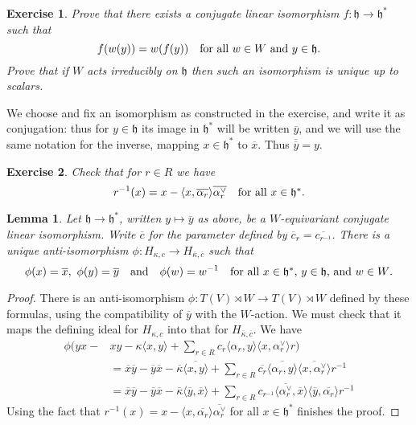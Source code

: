 \documentclass[12pt, reqno]{amsart}
\numberwithin{equation}{section}
\theoremstyle{definition}
\theoremstyle{plain}
\newtheorem{lemma}[theorem]{Lemma}
\newtheorem{exercise}{Exercise}
\newcommand{\hh}{\mathfrak{h}}
\newcommand{\la}{\langle}
\newcommand{\ra}{\rangle}
\begin{document}
\begin{exercise}
Prove that there exists a conjugate linear isomorphism $f:\hh \rightarrow \hh^*$ such that
$$f(w(y))=w(f(y)) \quad \hbox{for all $w \in W$ and $y \in \hh$.}$$ Prove that if $W$ acts irreducibly on $\hh$ then such an isomorphism is unique up to scalars.
\end{exercise}	

We choose and fix an isomorphism as constructed in the exercise, and write it as conjugation: thus for $y \in \hh$ its image in $\hh^*$ will be written $\overline{y}$, and we will use the same notation for the inverse, mapping $x \in \hh^*$ to $\overline{x}$. Thus $\overline{\overline{y}}=y$. 

\begin{exercise}
Check that for $r \in R$ we have
$$r^{-1}(x)=x-\la x, \overline{\alpha_r} \ra \overline{\alpha_r^\vee} \quad \hbox{for all $x \in \hh^*$.}$$	
\end{exercise}


\begin{lemma}
Let $\hh \rightarrow \hh^*$, written $y \mapsto \overline{y}$ as above, be a $W$-equivariant conjugate linear isomorphism. Write $\overline{c}$ for the parameter defined by $\overline{c}_r=\overline{c_{r^{-1}}}$. There is a unique anti-isomorphism $\phi:H_{\kappa,c} \rightarrow H_{\overline{\kappa}, \overline{c}}$ such that $$\phi(x)=\overline{x}, \ \phi(y)=\overline{y} \quad \text{and} \quad \phi(w)=w^{-1} \quad \hbox{for all $x \in \hh^*$, $y \in \hh$, and $w \in W$.}$$
\end{lemma}
\begin{proof}
There is an anti-isomorphism $\phi:T(V) \rtimes W \rightarrow T(V) \rtimes W$	defined by these formulas, using the compatibility of $\overline{y}$ with the $W$-action. We must check that it maps the defining ideal for $H_{\kappa,c}$ into that for $H_{\overline{\kappa},\overline{c}}$. We have 
\begin{align*}\phi(yx-&xy-\kappa \la x,y \ra+\sum_{r \in R} c_r \la\alpha_r, y \ra \la x,\alpha_r^\vee \ra r) \\
&=\overline{x}\overline{y}-\overline{y} \overline{x}-\overline{\kappa} \overline{\la x,y \ra}+\sum_{r \in R} \overline{c_r} \overline{\la \alpha_r,y \ra} \overline{ \la x,\alpha_r^\vee \ra} r^{-1} \\
&=\overline{x}\overline{y}-\overline{y} \overline{x}-\overline{\kappa} \la \overline{y},\overline{x} \ra+\sum_{r \in R} c_{r^{-1}} \la \overline{\alpha_r^\vee},\overline{x} \ra \la \overline{y},\overline{\alpha_r}\ra r^{-1}\end{align*} Using the fact that 
$r^{-1}(x)=x-\la x, \overline{\alpha_r} \ra \overline{\alpha_r^\vee}$ for all $x \in \hh^*$ finishes the proof.
\end{proof}
\end{document}
